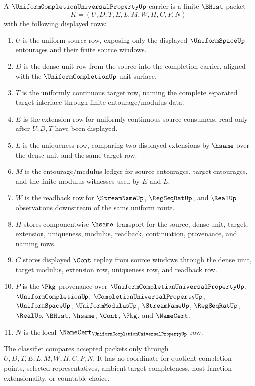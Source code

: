 \begin{definition}
\label{def:uniform-completion-universal-property-carrier}
A $\UniformCompletionUniversalPropertyUp$ carrier is a finite $\BHist$ packet
$$
K=(U,D,T,E,L,M,W,H,C,P,N)
$$
with the following displayed rows:
\begin{enumerate}
\item $U$ is the uniform source row, exposing only the displayed $\UniformSpaceUp$ entourages and their finite source windows.
\item $D$ is the dense unit row from the source into the completion carrier, aligned with the $\UniformCompletionUp$ unit surface.
\item $T$ is the uniformly continuous target row, naming the complete separated target interface through finite entourage/modulus data.
\item $E$ is the extension row for uniformly continuous source consumers, read only after $U,D,T$ have been displayed.
\item $L$ is the uniqueness row, comparing two displayed extensions by $\hsame$ over the dense unit and the same target row.
\item $M$ is the entourage/modulus ledger for source entourages, target entourages, and the finite modulus witnesses used by $E$ and $L$.
\item $W$ is the readback row for $\StreamNameUp$, $\RegSeqRatUp$, and $\RealUp$ observations downstream of the same uniform route.
\item $H$ stores componentwise $\hsame$ transport for the source, dense unit, target, extension, uniqueness, modulus, readback, continuation, provenance, and naming rows.
\item $C$ stores displayed $\Cont$ replay from source windows through the dense unit, target modulus, extension row, uniqueness row, and readback row.
\item $P$ is the $\Pkg$ provenance over $\UniformCompletionUniversalPropertyUp$, $\UniformCompletionUp$, $\CompletionUniversalPropertyUp$, $\UniformSpaceUp$, $\UniformModulusUp$, $\StreamNameUp$, $\RegSeqRatUp$, $\RealUp$, $\BHist$, $\hsame$, $\Cont$, $\Pkg$, and $\NameCert$.
\item $N$ is the local $\NameCert_{\UniformCompletionUniversalPropertyUp}$ row.
\end{enumerate}
The classifier compares accepted packets only through $U,D,T,E,L,M,W,H,C,P,N$. It has no coordinate for quotient completion points, selected representatives, ambient target completeness, host function extensionality, or countable choice.
\end{definition}


